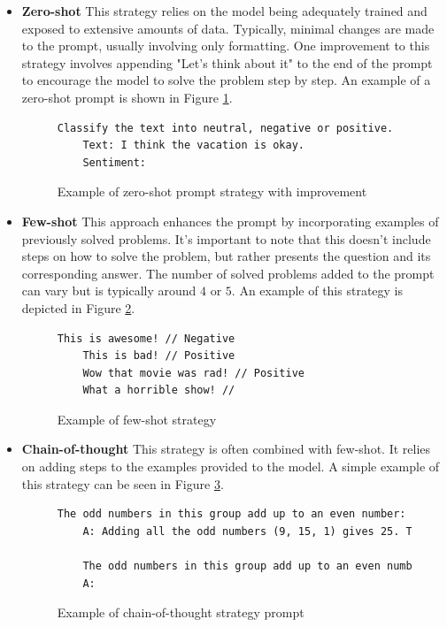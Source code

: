 \documentclass[fleqn,moreauthors,10pt]{ds_report}
\begin{document}
\begin{itemize}
    \item \textbf{Zero-shot} This strategy relies on the model being adequately trained and exposed to extensive amounts of data. Typically, minimal changes are made to the prompt, usually involving only formatting. One improvement to this strategy involves appending "Let's think about it" to the end of the prompt to encourage the model to solve the problem step by step. An example of a zero-shot prompt is shown in Figure \ref{text:zeroshot2}.

    \begin{figure}[htbp]
    \centering
    \begin{lstlisting}[language=TeX]
    Classify the text into neutral, negative or positive. 
    Text: I think the vacation is okay.
    Sentiment:
    \end{lstlisting}
    \caption{Example of zero-shot prompt strategy with improvement}
    \label{text:zeroshot2}
    \end{figure}

    \item \textbf{Few-shot} This approach enhances the prompt by incorporating examples of previously solved problems. It's important to note that this doesn't include steps on how to solve the problem, but rather presents the question and its corresponding answer. The number of solved problems added to the prompt can vary but is typically around $4$ or $5$. An example of this strategy is depicted in Figure \ref{text:few-shot}.

    \begin{figure}[htbp]
    \centering
    \begin{lstlisting}[language=TeX]
    This is awesome! // Negative
    This is bad! // Positive
    Wow that movie was rad! // Positive
    What a horrible show! //
    \end{lstlisting}
    \caption{Example of few-shot strategy}
    \label{text:few-shot}
    \end{figure}

    \item \textbf{Chain-of-thought} This strategy is often combined with few-shot. It relies on adding steps to the examples provided to the model. A simple example of this strategy can be seen in Figure \ref{text:COT}.

    \begin{figure}[htbp]
    \centering
    \begin{lstlisting}[language=TeX]
    The odd numbers in this group add up to an even number: 4, 8, 9, 15, 12, 2, 1.
    A: Adding all the odd numbers (9, 15, 1) gives 25. The answer is False.
    
    The odd numbers in this group add up to an even number: 15, 32, 5, 13, 82, 7, 1. 
    A:
    \end{lstlisting}
    \caption{Example of chain-of-thought strategy prompt}
    \label{text:COT}
    \end{figure}

\end{itemize}
\end{document}
